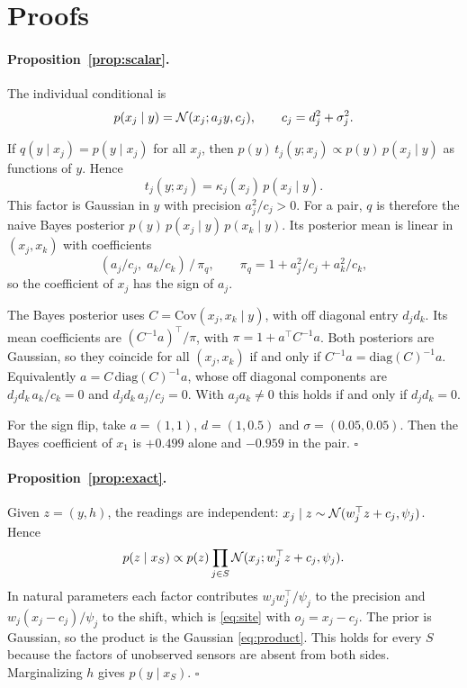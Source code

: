 \section{Proofs}
\label{app:proofs}

\paragraph{Proposition~\ref{prop:scalar}.}
The individual conditional is
\[
p(x_j\mid y)=\mathcal{N}(x_j;a_jy,c_j),\qquad c_j=d_j^2+\sigma_j^2.
\]

If $q(y\mid x_j)=p(y\mid x_j)$ for all $x_j$, then $p(y)\,t_j(y;x_j)\propto p(y)\,p(x_j\mid y)$ as functions of $y$.
Hence
\[
t_j(y;x_j)=\kappa_j(x_j)\,p(x_j\mid y).
\]
This factor is Gaussian in $y$ with precision $a_j^2/c_j>0$. For a pair, $q$
is therefore the naive Bayes posterior $p(y)\,p(x_j\mid y)\,p(x_k\mid y)$. Its posterior mean is linear in
$(x_j,x_k)$ with coefficients
\[
  (a_j/c_j,\;a_k/c_k)\,/\,\pi_q, \qquad \pi_q=1+a_j^2/c_j+a_k^2/c_k ,
\]
so the coefficient of $x_j$ has the sign of $a_j$.

The Bayes posterior uses $C=\mathrm{Cov}(x_j,x_k\mid y)$, with off diagonal entry $d_jd_k$. Its mean coefficients are
$(C^{-1}a)^\top/\pi$, with $\pi=1+a^\top C^{-1}a$. Both posteriors are Gaussian, so they coincide for all $(x_j,x_k)$
if and only if $C^{-1}a=\mathrm{diag}(C)^{-1}a$. Equivalently $a=C\,\mathrm{diag}(C)^{-1}a$, whose off diagonal
components are $d_jd_k\,a_k/c_k=0$ and $d_jd_k\,a_j/c_j=0$. With $a_ja_k\neq0$ this holds if and only if $d_jd_k=0$.

For the sign flip, take $a=(1,1)$, $d=(1,0.5)$ and $\sigma=(0.05,0.05)$. Then the Bayes coefficient of $x_1$ is
$+0.499$ alone and $-0.959$ in the pair. \hfill$\square$

\paragraph{Proposition~\ref{prop:exact}.}
Given $z=(y,h)$, the readings are independent: $x_j\mid z\sim\mathcal{N}(w_j^\top z+c_j,\psi_j)$. Hence
\[
  p(z\mid x_S)\propto p(z)\prod_{j\in S}\mathcal{N}(x_j;w_j^\top z+c_j,\psi_j).
\]
In natural parameters each factor contributes $w_jw_j^\top/\psi_j$ to the precision and $w_j(x_j-c_j)/\psi_j$ to the
shift, which is \eqref{eq:site} with $o_j=x_j-c_j$. The prior is Gaussian, so the product is the Gaussian
\eqref{eq:product}. This holds for every $S$ because the factors of unobserved sensors are absent from both sides.
Marginalizing $h$ gives $p(y\mid x_S)$. \hfill$\square$

